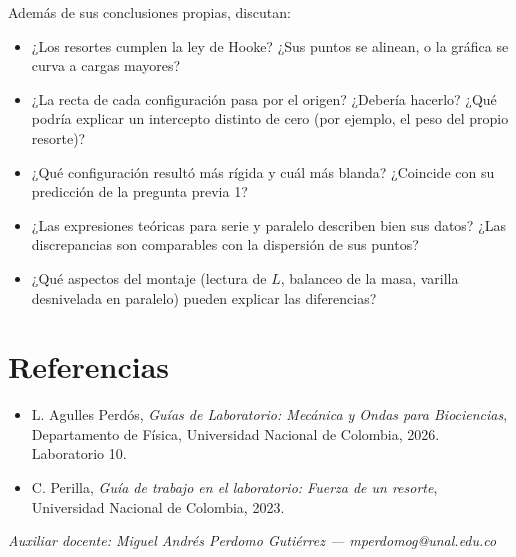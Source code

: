 \documentclass[11pt, letterpaper]{article}
\begin{document}
	Además de sus conclusiones propias, discutan:
	
	\begin{itemize}
		\item ¿Los resortes cumplen la ley de Hooke? ¿Sus puntos se alinean, o
		la gráfica se curva a cargas mayores?
		\item ¿La recta de cada configuración pasa por el origen? ¿Debería
		hacerlo? ¿Qué podría explicar un intercepto distinto de cero (por
		ejemplo, el peso del propio resorte)?
		\item ¿Qué configuración resultó más rígida y cuál más blanda? ¿Coincide
		con su predicción de la pregunta previa 1?
		\item ¿Las expresiones teóricas para serie y paralelo describen bien sus
		datos? ¿Las discrepancias son comparables con la dispersión de sus
		puntos?
		\item ¿Qué aspectos del montaje (lectura de $L$, balanceo de la masa,
		varilla desnivelada en paralelo) pueden explicar las diferencias?
	\end{itemize}
	
	\section{Referencias}
	
	\begin{itemize}
		\item L. Agulles Perdós, \emph{Guías de Laboratorio: Mecánica y Ondas
			para Biociencias}, Departamento de Física, Universidad Nacional de
		Colombia, 2026. Laboratorio 10.
		\item C. Perilla, \emph{Guía de trabajo en el laboratorio: Fuerza de un
			resorte}, Universidad Nacional de Colombia, 2023.
	\end{itemize}
	
	\vfill
	\noindent
	{\footnotesize \textit{Auxiliar docente: Miguel Andrés Perdomo Gutiérrez
			--- mperdomog@unal.edu.co}}
	
\end{document}
